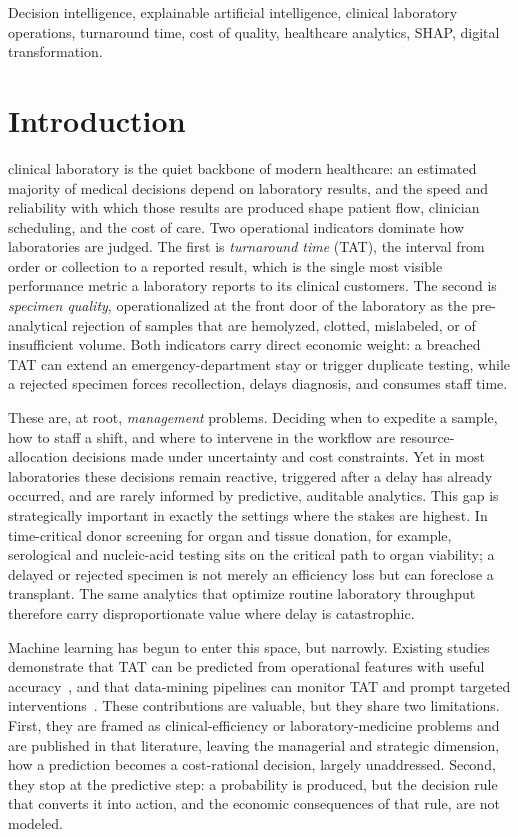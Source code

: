 \documentclass[journal]{IEEEtran}
\begin{document}
\begin{IEEEkeywords}
Decision intelligence, explainable artificial intelligence, clinical laboratory
operations, turnaround time, cost of quality, healthcare analytics, SHAP,
digital transformation.
\end{IEEEkeywords}

\section{Introduction}
 clinical laboratory is the quiet backbone of modern
healthcare: an estimated majority of medical decisions depend on laboratory
results, and the speed and reliability with which those results are produced
shape patient flow, clinician scheduling, and the cost of care. Two operational
indicators dominate how laboratories are judged. The first is \emph{turnaround
time} (TAT), the interval from order or collection to a reported result, which
is the single most visible performance metric a laboratory reports to its
clinical customers. The second is \emph{specimen quality}, operationalized at the
front door of the laboratory as the pre-analytical rejection of samples that are
hemolyzed, clotted, mislabeled, or of insufficient volume. Both indicators carry
direct economic weight: a breached TAT can extend an emergency-department stay or
trigger duplicate testing, while a rejected specimen forces recollection, delays
diagnosis, and consumes staff time.

These are, at root, \emph{management} problems. Deciding when to expedite a
sample, how to staff a shift, and where to intervene in the workflow are
resource-allocation decisions made under uncertainty and cost constraints. Yet in
most laboratories these decisions remain reactive, triggered after a delay has
already occurred, and are rarely informed by predictive, auditable analytics.
This gap is strategically important in exactly the settings where the stakes are
highest. In time-critical donor screening for organ and tissue donation, for
example, serological and nucleic-acid testing sits on the critical path to organ
viability; a delayed or rejected specimen is not merely an efficiency loss but can
foreclose a transplant. The same analytics that optimize routine laboratory
throughput therefore carry disproportionate value where delay is catastrophic.

Machine learning has begun to enter this space, but narrowly. Existing studies
demonstrate that TAT can be predicted from operational features with useful
accuracy~\cite{tatml2022,pathoml2026}, and that data-mining pipelines can monitor
TAT and prompt targeted interventions~\cite{orange2026,urinepretat2025}. These
contributions are valuable, but they share two limitations. First, they are framed
as clinical-efficiency or laboratory-medicine problems and are published in that
literature, leaving the managerial and strategic dimension, how a prediction
becomes a cost-rational decision, largely unaddressed. Second, they stop at the
predictive step: a probability is produced, but the decision rule that converts it
into action, and the economic consequences of that rule, are not modeled.
\end{document}
